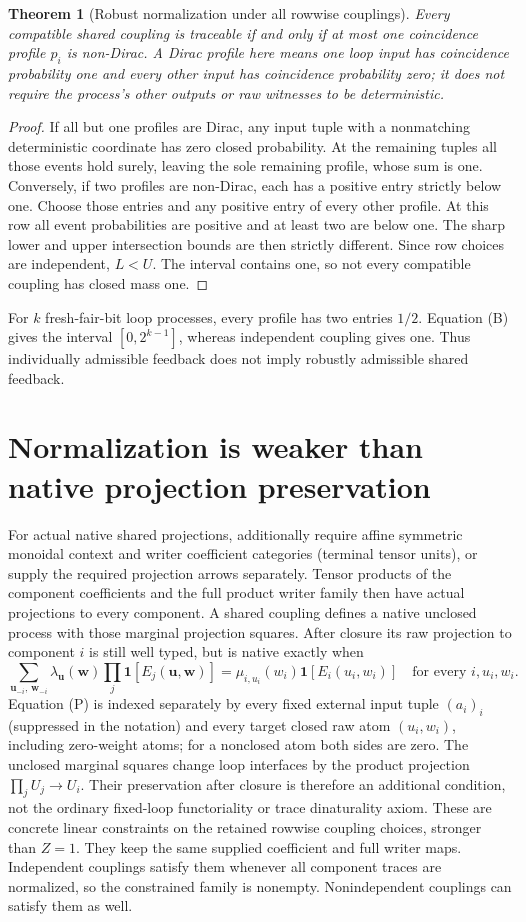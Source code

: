 \documentclass[11pt]{article}
\newtheorem{theorem}{Theorem}\newtheorem{proposition}[theorem]{Proposition}\newtheorem{lemma}[theorem]{Lemma}
\begin{document}
\begin{theorem}[Robust normalization under all rowwise couplings]
Every compatible shared coupling is traceable if and only if at most one coincidence profile $p_i$ is non-Dirac. A Dirac profile here means one loop input has coincidence probability one and every other input has coincidence probability zero; it does not require the process's other outputs or raw witnesses to be deterministic.
\end{theorem}
\begin{proof}
If all but one profiles are Dirac, any input tuple with a nonmatching deterministic coordinate has zero closed probability. At the remaining tuples all those events hold surely, leaving the sole remaining profile, whose sum is one. Conversely, if two profiles are non-Dirac, each has a positive entry strictly below one. Choose those entries and any positive entry of every other profile. At this row all event probabilities are positive and at least two are below one. The sharp lower and upper intersection bounds are then strictly different. Since row choices are independent, $L<U$. The interval contains one, so not every compatible coupling has closed mass one.
\end{proof}
For $k$ fresh-fair-bit loop processes, every profile has two entries $1/2$. Equation (B) gives the interval $[0,2^{k-1}]$, whereas independent coupling gives one. Thus individually admissible feedback does not imply robustly admissible shared feedback.

\section{Normalization is weaker than native projection preservation}
For actual native shared projections, additionally require affine symmetric monoidal context and writer coefficient categories (terminal tensor units), or supply the required projection arrows separately. Tensor products of the component coefficients and the full product writer family then have actual projections to every component. A shared coupling defines a native unclosed process with those marginal projection squares. After closure its raw projection to component $i$ is still well typed, but is native exactly when
\[
 \sum_{\mathbf u_{-i},\,\mathbf w_{-i}}\lambda_{\mathbf u}(\mathbf w)
       \prod_j\mathbf1[E_j(\mathbf u,\mathbf w)]
 =\mu_{i,u_i}(w_i)\mathbf1[E_i(u_i,w_i)]
 \quad\text{for every }i,u_i,w_i. \tag{P}
\]
Equation (P) is indexed separately by every fixed external input tuple $(a_i)_i$ (suppressed in the notation) and every target closed raw atom $(u_i,w_i)$, including zero-weight atoms; for a nonclosed atom both sides are zero. The unclosed marginal squares change loop interfaces by the product projection $\prod_jU_j\to U_i$. Their preservation after closure is therefore an additional condition, not the ordinary fixed-loop functoriality or trace dinaturality axiom. These are concrete linear constraints on the retained rowwise coupling choices, stronger than $Z=1$. They keep the same supplied coefficient and full writer maps. Independent couplings satisfy them whenever all component traces are normalized, so the constrained family is nonempty. Nonindependent couplings can satisfy them as well.
\end{document}

